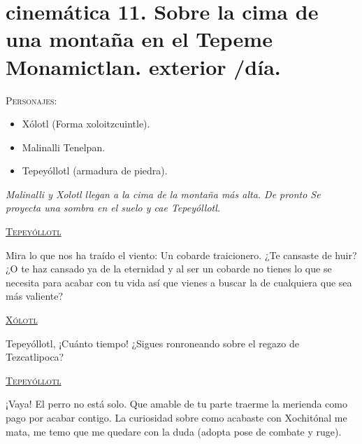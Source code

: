 \section{cinemática 11. Sobre la cima de una montaña en el Tepeme Monamictlan. exterior /día.}
\label{Cin:Cinematica11}
 \textsc{Personajes}:
 \begin{itemize}
 	\item Xólotl (Forma xoloitzcuintle).
	\item Malinalli Tenelpan.
	\item Tepeyóllotl (armadura de piedra).
 \end{itemize}
 
 \textit{Malinalli y Xolotl llegan a la cima de la montaña más alta. De pronto Se proyecta una sombra en el suelo y cae Tepeyóllotl.}
 
\begin{center}
\textsc{\underline{Tepeyóllotl}}
\\
\par
Mira lo que nos ha traído el viento: Un cobarde traicionero. ¿Te cansaste de huir? ¿O te haz cansado ya de la eternidad y al ser un cobarde no tienes lo que se necesita para acabar con tu vida así que vienes a buscar la de cualquiera que sea más valiente? 
\\
\par
\textsc{\underline{Xólotl}}
\\
\par
Tepeyóllotl, ¡Cuánto tiempo! ¿Sigues ronroneando sobre el regazo de Tezcatlipoca?
\\
\par
\textsc{\underline{Tepeyóllotl}}
\\
\par
¡Vaya! El perro no está solo. Que amable de tu parte traerme la merienda como pago por acabar contigo. La curiosidad sobre como acabaste con Xochitónal me mata, me temo que me quedare con la duda (adopta pose de combate y ruge). 
\end{center}
